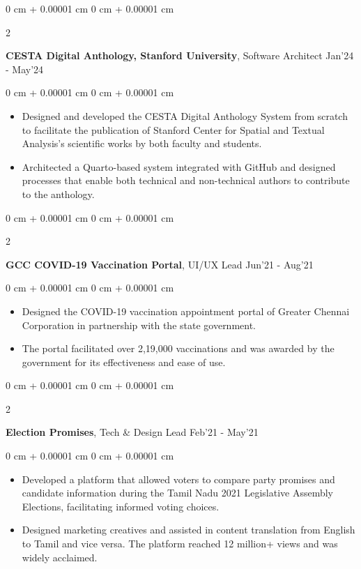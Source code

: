 \documentclass[10pt, letterpaper]{article}
\newenvironment{highlights}{
    \begin{itemize}[
        topsep=0.10 cm,
        parsep=0.10 cm,
        partopsep=0pt,
        itemsep=0pt,
        leftmargin=0 cm + 10pt
    ]
}{
    \end{itemize}
} %
\newenvironment{onecolentry}{
    \begin{adjustwidth}{
        0 cm + 0.00001 cm
    }{
        0 cm + 0.00001 cm
    }
}{
    \end{adjustwidth}
} %
\newenvironment{twocolentry}[2][]{
    \onecolentry
    \def\secondColumn{#2}
    \setcolumnwidth{\fill, 4.5 cm}
    \begin{paracol}{2}
}{
    \switchcolumn \raggedleft \secondColumn
    \end{paracol}
    \endonecolentry
} %
\newcommand{\datetext}[1]{\color{gray800}#1}
\newcommand{\socialimpactprojectentry}[3]{
    \begin{twocolentry}{
        \datetext{#3}
    }
        \textbf{#1}, #2\end{twocolentry}

    \vspace{0.10 cm}
}
\newcommand{\itemspacing}[1]{\vspace{0.275 cm}#1}
\begin{document}
        \socialimpactprojectentry{CESTA Digital Anthology, Stanford University}{Software Architect}{Jan'24 - May'24}
            \begin{onecolentry}
                \begin{highlights}
                    \item  Designed and developed the CESTA Digital Anthology System from scratch to facilitate the publication of Stanford Center for Spatial and Textual Analysis's scientific works by both faculty and students.
                    \item Architected a Quarto-based system integrated with GitHub and designed processes that enable both technical and non-technical authors to contribute to the anthology.
                \end{highlights}
            \end{onecolentry}
        
        \itemspacing
        
        \socialimpactprojectentry{GCC COVID-19 Vaccination Portal}{UI/UX Lead}{Jun'21 - Aug'21}
            \begin{onecolentry}
                \begin{highlights}
                    \item  Designed the COVID-19 vaccination appointment portal of Greater Chennai Corporation in partnership with the state government.
                    \item The portal facilitated over 2,19,000 vaccinations and was awarded by the government for its effectiveness and ease of use. 
                \end{highlights}
            \end{onecolentry}
        
        \itemspacing

        \socialimpactprojectentry{Election Promises}{Tech \& Design Lead}{Feb'21 - May'21}
            \begin{onecolentry}
                \begin{highlights}
                    \item  Developed a platform that allowed voters to compare party promises and candidate information during the Tamil Nadu 2021 Legislative Assembly Elections, facilitating informed voting choices.
                    \item Designed marketing creatives and assisted in content translation from English to Tamil and vice versa. The platform reached 12 million+ views and was widely acclaimed. 
                \end{highlights}
            \end{onecolentry}
\end{document}
